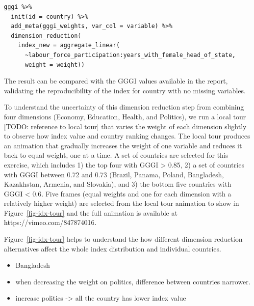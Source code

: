 \documentclass[
]{interact}
\providecommand{\tightlist}{%
  \setlength{\itemsep}{0pt}\setlength{\parskip}{0pt}}\usepackage{longtable,booktabs,array}
\begin{document}
\begin{verbatim}
gggi %>% 
  init(id = country) %>%
  add_meta(gggi_weights, var_col = variable) %>% 
  dimension_reduction(
    index_new = aggregate_linear(
      ~labour_force_participation:years_with_female_head_of_state,
      weight = weight)) 
\end{verbatim}

The result can be compared with the GGGI values available in the report,
validating the reproducibility of the index for country with no missing
variables.

To understand the uncertainty of this dimension reduction step from
combining four dimensions (Economy, Education, Health, and Politics), we
run a local tour {[}TODO: reference to local tour{]} that varies the
weight of each dimension slightly to observe how index value and country
ranking changes. The local tour produces an animation that gradually
increases the weight of one variable and reduces it back to equal
weight, one at a time. A set of countries are selected for this
exercise, which includes 1) the top four with GGGI \textgreater{} 0.85,
2) a set of countries with GGGI between 0.72 and 0.73 (Brazil, Panama,
Poland, Bangladesh, Kazakhstan, Armenia, and Slovakia), and 3) the
bottom five countries with GGGI \textless{} 0.6. Five frames (equal
weights and one for each dimension with a relatively higher weight) are
selected from the local tour animation to show in
Figure~\ref{fig-idx-tour} and the full animation is available at
https://vimeo.com/847874016.

Figure~\ref{fig-idx-tour} helps to understand the how different
dimension reduction alternatives affect the whole index distribution and
individual countries.

\begin{itemize}
\tightlist
\item
  Bangladesh
\item
  when decreasing the weight on politics, difference between countries
  narrower.
\item
  increase politics -\textgreater{} all the country has lower index
  value
\end{itemize}
\end{document}
